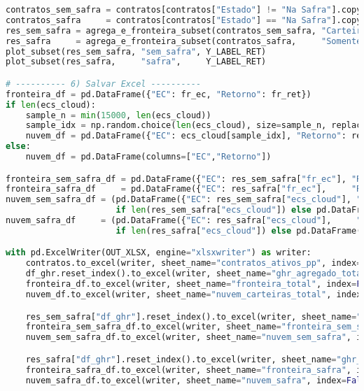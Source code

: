\documentclass[11pt,a4paper]{article}
\newcommand{\1}{\mathbf{1}}
\begin{document}
\begin{lstlisting}[language=Python, caption={risk_frontier.py}]
contratos_sem_safra = contratos[contratos["Estado"] != "Na Safra"].copy()
contratos_safra     = contratos[contratos["Estado"] == "Na Safra"].copy()
res_sem_safra = agrega_e_fronteira_subset(contratos_sem_safra, "Carteira (sem Safra)")
res_safra     = agrega_e_fronteira_subset(contratos_safra,     "Somente Safra")
plot_subset(res_sem_safra, "sem_safra", Y_LABEL_RET)
plot_subset(res_safra,     "safra",     Y_LABEL_RET)

# ---------- 6) Salvar Excel ----------
fronteira_df = pd.DataFrame({"EC": fr_ec, "Retorno": fr_ret})
if len(ecs_cloud):
    sample_n = min(15000, len(ecs_cloud))
    sample_idx = np.random.choice(len(ecs_cloud), size=sample_n, replace=False)
    nuvem_df = pd.DataFrame({"EC": ecs_cloud[sample_idx], "Retorno": rets_cloud[sample_idx]})
else:
    nuvem_df = pd.DataFrame(columns=["EC","Retorno"])

fronteira_sem_safra_df = pd.DataFrame({"EC": res_sem_safra["fr_ec"], "Retorno": res_sem_safra["fr_ret"]})
fronteira_safra_df     = pd.DataFrame({"EC": res_safra["fr_ec"],     "Retorno": res_safra["fr_ret"]})
nuvem_sem_safra_df = (pd.DataFrame({"EC": res_sem_safra["ecs_cloud"], "Retorno": res_sem_safra["rets_cloud"]})
                      if len(res_sem_safra["ecs_cloud"]) else pd.DataFrame(columns=["EC","Retorno"]))
nuvem_safra_df     = (pd.DataFrame({"EC": res_safra["ecs_cloud"],     "Retorno": res_safra["rets_cloud"]})
                      if len(res_safra["ecs_cloud"]) else pd.DataFrame(columns=["EC","Retorno"]))

with pd.ExcelWriter(OUT_XLSX, engine="xlsxwriter") as writer:
    contratos.to_excel(writer, sheet_name="contratos_ativos_pp", index=False)
    df_ghr.reset_index().to_excel(writer, sheet_name="ghr_agregado_total", index=False)
    fronteira_df.to_excel(writer, sheet_name="fronteira_total", index=False)
    nuvem_df.to_excel(writer, sheet_name="nuvem_carteiras_total", index=False)

    res_sem_safra["df_ghr"].reset_index().to_excel(writer, sheet_name="ghr_agregado_sem_safra", index=False)
    fronteira_sem_safra_df.to_excel(writer, sheet_name="fronteira_sem_safra", index=False)
    nuvem_sem_safra_df.to_excel(writer, sheet_name="nuvem_sem_safra", index=False)

    res_safra["df_ghr"].reset_index().to_excel(writer, sheet_name="ghr_agregado_safra", index=False)
    fronteira_safra_df.to_excel(writer, sheet_name="fronteira_safra", index=False)
    nuvem_safra_df.to_excel(writer, sheet_name="nuvem_safra", index=False)


\end{lstlisting}
\end{document}
